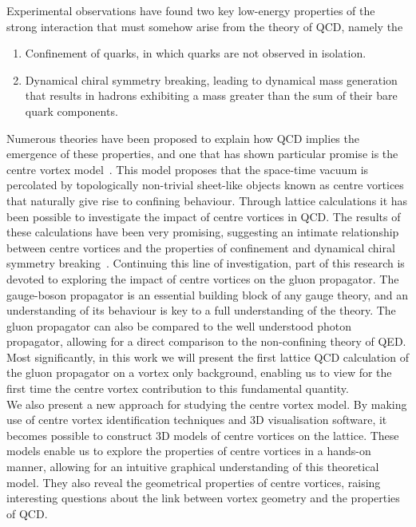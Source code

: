 Experimental observations have found two key low-energy properties of the strong interaction that must somehow arise from the theory of QCD, namely the
%
\begin{enumerate}
\item Confinement of quarks, in which quarks are not observed in isolation.
\item Dynamical chiral symmetry breaking, leading to dynamical mass generation that results in hadrons exhibiting a mass greater than the sum of their bare quark components.
\end{enumerate}
%
Numerous theories have been proposed to explain how QCD implies the emergence of these properties, and one that has shown particular promise is the centre vortex model~\cite{Nielsen:1979xu,DelDebbio:1996lih,'tHooft:1977hy}. This model proposes that the space-time vacuum is percolated by topologically non-trivial sheet-like objects known as centre vortices that naturally give rise to confining behaviour. Through lattice calculations it has been possible to investigate the impact of centre vortices in QCD. The results of these calculations have been very promising, suggesting an intimate relationship between centre vortices and the properties of confinement and dynamical chiral symmetry breaking~\cite{Biddle:2018dtc,Bowman:2008qd,Trewartha:2015ida,Trewartha:2015nna,Trewartha:2017ive,Greensite:2003bk,OMalley:2011aa,Bowman:2010zr}. Continuing this line of investigation, part of this research is devoted to exploring the impact of centre vortices on the gluon propagator. The gauge-boson propagator is an essential building block of any gauge theory, and an understanding of its behaviour is key to a full understanding of the theory. The gluon propagator can also be compared to the well understood photon propagator, allowing for a direct comparison to the non-confining theory of QED. Most significantly, in this work we will present the first lattice QCD calculation of the gluon propagator on a vortex only background, enabling us to view for the first time the centre vortex contribution to this fundamental quantity.\\

We also present a new approach for studying the centre vortex model. By making use of centre vortex identification techniques and 3D visualisation software, it becomes possible to construct 3D models of centre vortices on the lattice. These models enable us to explore the properties of centre vortices in a hands-on manner, allowing for an intuitive graphical understanding of this theoretical model. They also reveal the geometrical properties of centre vortices, raising interesting questions about the link between vortex geometry and the properties of QCD.\\

